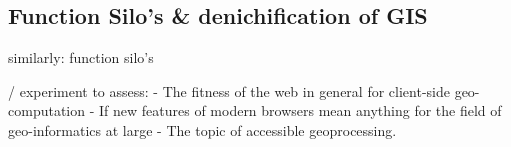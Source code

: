 



\subsection*{Function Silo's \& denichification of GIS}

similarly: function silo's 

/ experiment to assess: 
- The fitness of the web in general for client-side geo-computation
- If new features of modern browsers mean anything for the field of geo-informatics at large 
- The topic of accessible geoprocessing.

